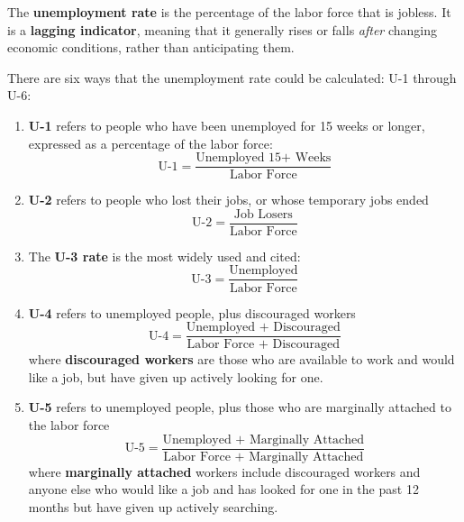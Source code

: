 \documentclass{article}
\begin{document}
    \begin{definition}
      \label{def:unemployment-rate}
      The \textbf{unemployment rate} is the percentage of the labor force that is jobless. It is a \textbf{lagging indicator}, meaning that it generally rises or falls \textit{after} changing economic conditions, rather than anticipating them. 

      There are six ways that the unemployment rate could be calculated: U-1 through U-6: 
      \begin{enumerate}
        \item \textbf{U-1} refers to people who have been unemployed for 15 weeks or longer, expressed as a percentage of the labor force: 
        \begin{equation}
          \text{U-1} = \frac{\text{Unemployed 15+ Weeks}}{\text{Labor Force}}
        \end{equation}
        \item \textbf{U-2} refers to people who lost their jobs, or whose temporary jobs ended
        \begin{equation}
          \text{U-2} = \frac{\text{Job Losers}}{\text{Labor Force}}
        \end{equation}
        \item The \textbf{U-3 rate} is the most widely used and cited: 
        \begin{equation}
          \text{U-3} = \frac{\text{Unemployed}}{\text{Labor Force}}
        \end{equation}
        \item \textbf{U-4} refers to unemployed people, plus discouraged workers
        \begin{equation}
          \text{U-4} = \frac{\text{Unemployed + Discouraged}}{\text{Labor Force + Discouraged}}
        \end{equation}
        where \textbf{discouraged workers} are those who are available to work and would like a job, but have given up actively looking for one. 
        \item \textbf{U-5} refers to unemployed people, plus those who are marginally attached to the labor force
        \begin{equation}
          \text{U-5} = \frac{\text{Unemployed + Marginally Attached}}{\text{Labor Force + Marginally Attached}}
        \end{equation}
        where \textbf{marginally attached} workers include discouraged workers and anyone else who would like a job and has looked for one in the past 12 months but have given up actively searching. 

\end{enumerate}
\end{definition}
\end{document}
